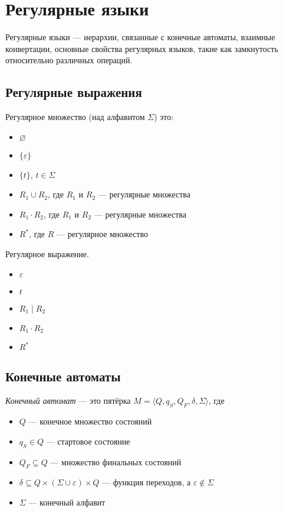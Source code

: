 \chapter{Регулярные языки}


Регулярные языки --- иерархии, связанные с конечные автоматы, взаимные конвертации, основные свойства регулярных языков, такие как замкнутость относительно различных операций.


\section{Регулярные выражения}

\begin{definition}
    Регулярное множество (над алфавитом $\Sigma$) это:
    \begin{itemize}
        \item $\varnothing$
        \item $\{\varepsilon\}$
        \item $\{t\}$, $t \in \Sigma$
        \item $R_1 \cup R_2$, где $R_1$ и $R_2$ --- регулярные множества
        \item $R_1 \cdot R_2$, где $R_1$ и $R_2$ --- регулярные множества
        \item $R^*$, где $R$ --- регулярное множество
    \end{itemize}
\end{definition}


\begin{definition}
    Регулярное выражение.
    \begin{itemize}
        \item $\varepsilon$
        \item $t$
        \item $R_1 \mid R_2$
        \item $R_1 \cdot R_2$
        \item $R^*$
    \end{itemize}
\end{definition}

\section{Конечные автоматы}

\begin{definition}\label{def:FiniteAutomata}
    \textit{Конечный автомат} --- это пятёрка $M = \langle Q, q_S, Q_F, \delta, \Sigma \rangle$, где
    \begin{itemize}
        \item $Q$ --- конечное множество состояний
        \item $q_S \in Q$ --- стартовое состояние
        \item $Q_F \subseteq Q$ --- множество финальных состояний
        \item $\delta \subseteq Q \times (\Sigma \cup \varepsilon) \times Q$ --- функция переходов, а $\varepsilon \notin \Sigma$
        \item $\Sigma$ --- конечный алфавит
    \end{itemize}
\end{definition}

